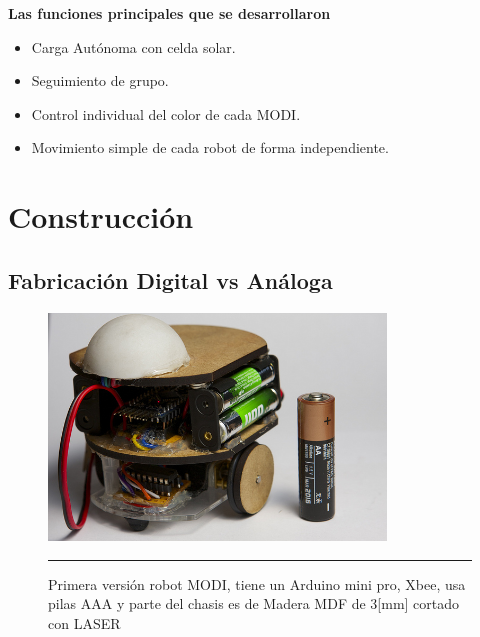 \textbf{Las funciones principales que se desarrollaron}

\begin{itemize}
\item Carga Autónoma con celda solar.
\item Seguimiento de grupo.
\item Control individual del color de cada MODI.
\item Movimiento simple de cada robot de forma independiente.
\end{itemize}


\section{Construcción}

\subsection{Fabricación Digital vs Análoga}

\begin{figure}[htbp]
	\centering
		\includegraphics[width=0.8\textwidth]{./Pictures/MODIrev1.jpg}
		\rule{35em}{0.5pt}
	\caption[modi]{Primera versión robot MODI, tiene un Arduino mini pro, Xbee, usa pilas AAA y parte del chasis es de Madera MDF de 3[mm] cortado con LASER}
	\label{fig:modi}
\end{figure}

